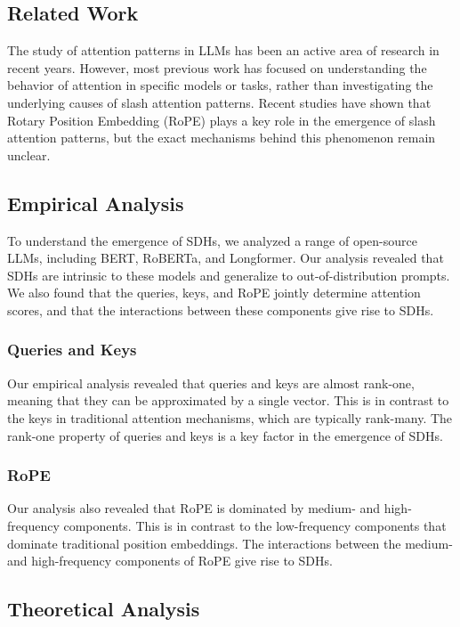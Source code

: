 \documentclass{article}
\begin{document}
\subsection{Related Work}

The study of attention patterns in LLMs has been an active area of research in recent years. However, most previous work has focused on understanding the behavior of attention in specific models or tasks, rather than investigating the underlying causes of slash attention patterns. Recent studies have shown that Rotary Position Embedding (RoPE) plays a key role in the emergence of slash attention patterns, but the exact mechanisms behind this phenomenon remain unclear.

\subsection{Empirical Analysis}

To understand the emergence of SDHs, we analyzed a range of open-source LLMs, including BERT, RoBERTa, and Longformer. Our analysis revealed that SDHs are intrinsic to these models and generalize to out-of-distribution prompts. We also found that the queries, keys, and RoPE jointly determine attention scores, and that the interactions between these components give rise to SDHs.

\subsubsection{Queries and Keys}

Our empirical analysis revealed that queries and keys are almost rank-one, meaning that they can be approximated by a single vector. This is in contrast to the keys in traditional attention mechanisms, which are typically rank-many. The rank-one property of queries and keys is a key factor in the emergence of SDHs.

\subsubsection{RoPE}

Our analysis also revealed that RoPE is dominated by medium- and high-frequency components. This is in contrast to the low-frequency components that dominate traditional position embeddings. The interactions between the medium- and high-frequency components of RoPE give rise to SDHs.

\subsection{Theoretical Analysis}
\end{document}
